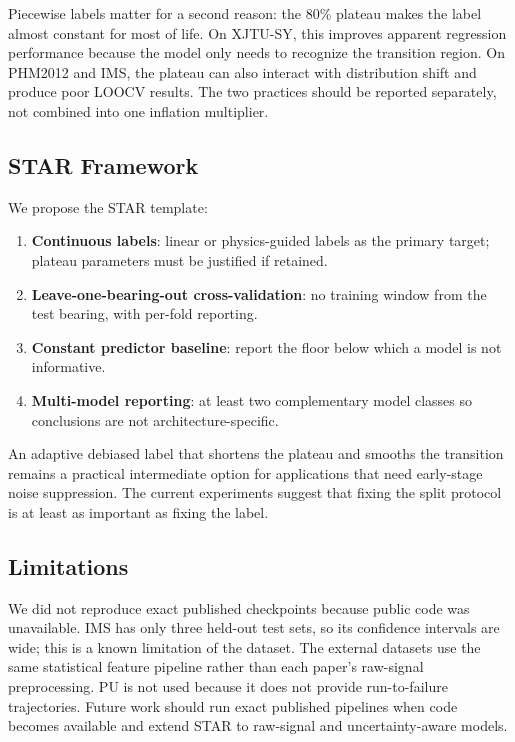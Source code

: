 \documentclass[5p,twocolumn]{elsarticle}
\begin{document}
Piecewise labels matter for a second reason: the 80\% plateau makes the label almost constant for most of life. On XJTU-SY, this improves apparent regression performance because the model only needs to recognize the transition region. On PHM2012 and IMS, the plateau can also interact with distribution shift and produce poor LOOCV results. The two practices should be reported separately, not combined into one inflation multiplier.

\subsection{STAR Framework}
We propose the STAR template:
\begin{enumerate}
    \item \textbf{Continuous labels}: linear or physics-guided labels as the primary target; plateau parameters must be justified if retained.
    \item \textbf{Leave-one-bearing-out cross-validation}: no training window from the test bearing, with per-fold reporting.
    \item \textbf{Constant predictor baseline}: report the floor below which a model is not informative.
    \item \textbf{Multi-model reporting}: at least two complementary model classes so conclusions are not architecture-specific.
\end{enumerate}
An adaptive debiased label that shortens the plateau and smooths the transition remains a practical intermediate option for applications that need early-stage noise suppression. The current experiments suggest that fixing the split protocol is at least as important as fixing the label.

\subsection{Limitations}
We did not reproduce exact published checkpoints because public code was unavailable. IMS has only three held-out test sets, so its confidence intervals are wide; this is a known limitation of the dataset. The external datasets use the same statistical feature pipeline rather than each paper's raw-signal preprocessing. PU is not used because it does not provide run-to-failure trajectories. Future work should run exact published pipelines when code becomes available and extend STAR to raw-signal and uncertainty-aware models.
\end{document}
